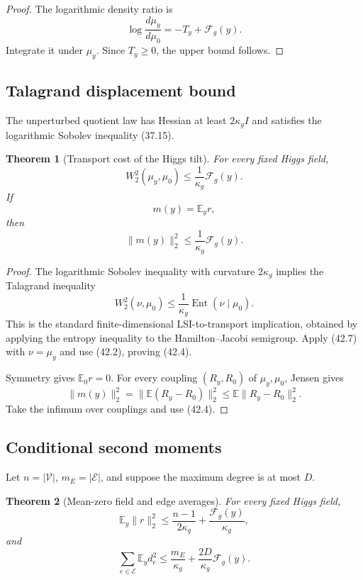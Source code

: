 \documentclass[11pt]{article}
\newtheorem{theorem}{Theorem}[section]
\theoremstyle{remark}
\begin{document}
\begin{proof}
The logarithmic density ratio is
\[
 \log\frac{d\mu_y}{d\mu_0}
 =-T_y+\mathcal F_g(y).                            \tag{42.3}
\]
Integrate it under \(\mu_y\).  Since \(T_y\geq0\), the upper bound
follows.
\end{proof}

\subsection{Talagrand displacement bound}

The unperturbed quotient law has Hessian at least
\(2\kappa_gI\) and satisfies the logarithmic Sobolev inequality
(37.15).

\begin{theorem}[Transport cost of the Higgs tilt]
\label{thm:v17v42-t2}
For every fixed Higgs field,
\[
\boxed{
 W_2^2(\mu_y,\mu_0)
 \leq\frac{1}{\kappa_g}\mathcal F_g(y).}          \tag{42.4}
\]
If
\[
 m(y)=\mathbb E_y r,                               \tag{42.5}
\]
then
\[
 \boxed{
 \|m(y)\|_2^2
 \leq\frac{1}{\kappa_g}\mathcal F_g(y).}          \tag{42.6}
\]
\end{theorem}

\begin{proof}
The logarithmic Sobolev inequality with curvature
\(2\kappa_g\) implies the Talagrand inequality
\[
 W_2^2(\nu,\mu_0)
 \leq\frac1{\kappa_g}
 \operatorname{Ent}(\nu\mid\mu_0).                \tag{42.7}
\]
This is the standard finite-dimensional LSI-to-transport implication,
obtained by applying the entropy inequality to the Hamilton--Jacobi
semigroup.  Apply (42.7) with \(\nu=\mu_y\) and use (42.2), proving
(42.4).

Symmetry gives \(\mathbb E_0r=0\).  For every coupling
\((R_y,R_0)\) of \(\mu_y,\mu_0\), Jensen gives
\[
 \|m(y)\|_2^2
 =\|\mathbb E(R_y-R_0)\|_2^2
 \leq\mathbb E\|R_y-R_0\|_2^2.                   \tag{42.8}
\]
Take the infimum over couplings and use (42.4).
\end{proof}

\subsection{Conditional second moments}

Let \(n=|\mathcal V|\), \(m_E=|\mathcal E|\), and suppose the maximum
degree is at most \(D\).

\begin{theorem}[Mean-zero field and edge averages]
\label{thm:v17v42-conditional}
For every fixed Higgs field,
\[
 \mathbb E_y\|r\|_2^2
 \leq\frac{n-1}{2\kappa_g}
 +\frac{\mathcal F_g(y)}{\kappa_g},                \tag{42.9}
\]
and
\[
 \sum_{e\in\mathcal E}\mathbb E_y d_e^2
 \leq\frac{m_E}{\kappa_g}
 +\frac{2D}{\kappa_g}\mathcal F_g(y).             \tag{42.10}
\]
\end{theorem}
\end{document}
